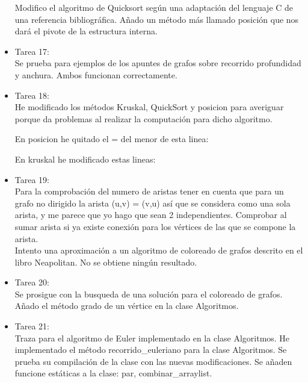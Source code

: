 \begin{itemize}
Modifico el algoritmo de Quicksort según una adaptación del lenguaje C de una referencia bibliográfica. Añado un método más llamado posición que nos dará el pivote de la estructura interna.\\ 

\item Tarea 17:\\
Se prueba para ejemplos de los apuntes de grafos sobre recorrido profundidad y anchura. Ambos funcionan correctamente.\\


\item Tarea 18:\\
He modificado los métodos Kruskal, QuickSort y posicion para averiguar porque da problemas al realizar la computación para dicho algoritmo.

En posicion he quitado el = del menor de esta linea:



En kruskal he modificado estas lineas:



\item Tarea 19:\\
Para la comprobación del numero de aristas tener en cuenta que para un grafo no dirigido la arista (u,v) = (v,u) así que se considera como una sola arista, y me parece que yo hago que sean 2 independientes. Comprobar al sumar arista si ya existe conexión para los vértices de las que se compone la arista.\\

Intento una aproximación a un algoritmo de coloreado de grafos descrito en el libro Neapolitan. No se obtiene ningún resultado.\\

\item Tarea 20:\\
Se prosigue con la busqueda de una solución para el coloreado de grafos. Añado el método grado de un vértice en la clase Algoritmos.\\

\item Tarea 21:\\
Traza para el algoritmo de Euler implementado en la clase Algoritmos. He implementado el método recorrido\_euleriano para la clase Algoritmos. Se prueba su compilación de la clase con las nuevas modificaciones. Se añaden funcione estáticas a la clase: par, combinar\_arraylist.\\


\end{itemize}
